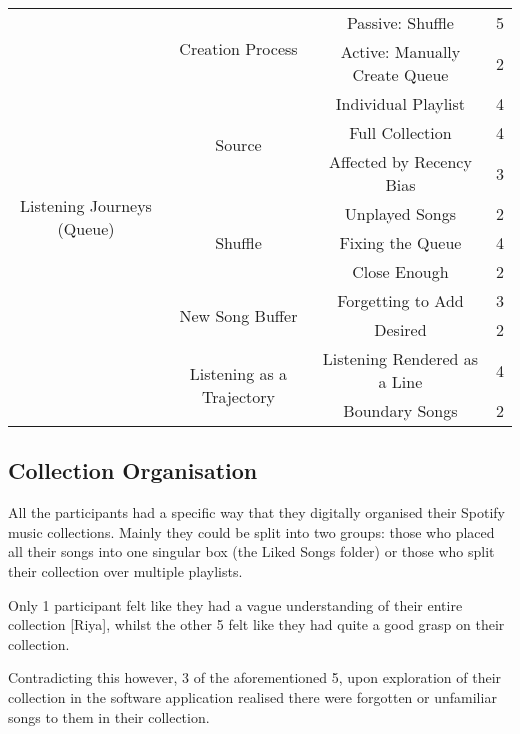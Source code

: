 \begin{longtable}[c]{| c | c | c | c}
    \multirow{12}{6em}{Listening Journeys (Queue)} & \multirow{2}{*}{Creation Process} & Passive: Shuffle & 5\\*
    \cmidrule{3-4}
            & & Active: Manually Create Queue & 2\\*
        \cmidrule{2-4}
        & \multirow{3}{*}{Source} & Individual Playlist & 4\\*
        \cmidrule{3-4}
            & & Full Collection & 4\\*
            \cmidrule{3-4}
            & & Affected by Recency Bias & 3\\*
        \cmidrule{2-4}
        & \multirow{3}{*}{Shuffle} & Unplayed Songs & 2\\*
        \cmidrule{3-4}
            & & Fixing the Queue & 4\\*
            \cmidrule{3-4}
            & & Close Enough & 2\\*
        \cmidrule{2-4}
        & \multirow{2}{*}{New Song Buffer} & Forgetting to Add & 3\\*
        \cmidrule{3-4}
            & & Desired & 2\\*
        \cmidrule{2-4}
        & \multirow{2}{*}{Listening as a Trajectory} & Listening Rendered as a Line & 4\\*
        \cmidrule{3-4}
            & & Boundary Songs & 2\\*%
    \midrule
\end{longtable}

\subsection{Collection Organisation}%
All the participants had a specific way that they digitally organised their Spotify music collections. Mainly they could be split into two groups: those who placed all their songs into one singular box (the Liked Songs folder) or those who split their collection over multiple playlists.

Only 1 participant felt like they had a vague understanding of their entire collection [Riya], whilst the other 5 felt like they had quite a good grasp on their collection.

Contradicting this however, 3 of the aforementioned 5, upon exploration of their collection in the software application realised there were forgotten or unfamiliar songs to them in their collection.

